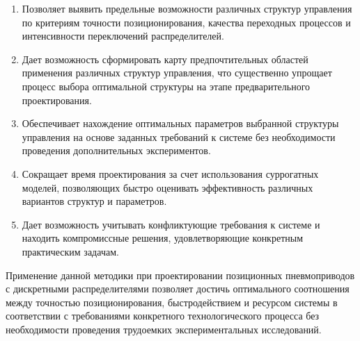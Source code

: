 \begin{enumerate}
    \item Позволяет выявить предельные возможности различных структур
	управления по критериям точности позиционирования, качества
	переходных процессов и интенсивности переключений распределителей.
    
    \item Дает возможность сформировать карту предпочтительных областей
	применения различных структур управления, что существенно упрощает
	процесс выбора оптимальной структуры на этапе предварительного проектирования.
    
    \item Обеспечивает нахождение оптимальных параметров выбранной структуры
	управления на основе заданных требований к системе без необходимости
	проведения дополнительных экспериментов.
    
    \item Сокращает время проектирования за счет использования суррогатных
	моделей, позволяющих быстро оценивать эффективность различных вариантов
	структур и параметров.
    
    \item Дает возможность учитывать конфликтующие требования к системе
	и находить компромиссные решения, удовлетворяющие конкретным
	практическим задачам.
\end{enumerate}

Применение данной методики при проектировании позиционных пневмоприводов с
дискретными распределителями позволяет достичь оптимального соотношения между
точностью позиционирования, быстродействием и ресурсом системы в соответствии
с требованиями конкретного технологического процесса без необходимости проведения
трудоемких экспериментальных исследований.




